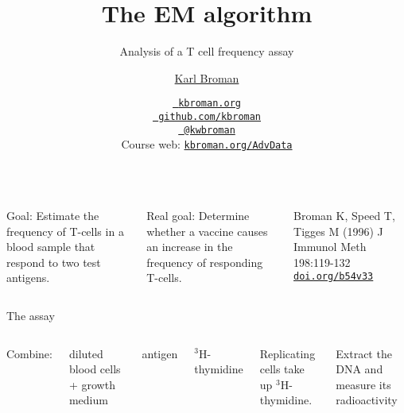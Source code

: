 \documentclass[aspectratio=169,12pt,t]{beamer}
\title{The EM algorithm}
\subtitle{Analysis of a T cell frequency assay}
\author{\href{https://kbroman.org}{Karl Broman}}
\institute{Biostatistics \& Medical Informatics, UW{\textendash}Madison}
\date{\href{https://kbroman.org}{\tt \scriptsize \color{foreground} kbroman.org}
\\[-4pt]
\href{https://github.com/kbroman}{\tt \scriptsize \color{foreground} github.com/kbroman}
\\[-4pt]
\href{https://twitter.com/kwbroman}{\tt \scriptsize \color{foreground} @kwbroman}
\\[-4pt]
{\scriptsize Course web: \href{https://kbroman.org/AdvData}{\tt kbroman.org/AdvData}}
}
\begin{document}
{
\frame{
  \titlepage

  \note{}

} }


\begin{frame}[c]{}

  \begin{columns}[c]
    \fontsize{10pt}{11}\selectfont
      \bbi
      \item[\hilit Goal:] Estimate the frequency of T-cells in a blood
        sample that respond to two test antigens.

      \item[\hilit Real goal:] Determine whether a vaccine causes an
        increase in the frequency of responding T-cells.
      \ei

      \vspace{10mm}

      \hspace*{-0.2\textwidth} {\fontsize{6pt}{6}\selectfont Broman K, Speed T, Tigges M (1996)
        J Immunol Meth 198:119-132
        \href{https://doi.org/b54v33}{\tt doi.org/b54v33}}



  \end{columns}


\end{frame}



\begin{frame}[c]{The assay}

  \begin{columns}[c]
    \fontsize{10pt}{11}\selectfont

    \bbi
  \item Combine:
    \bi
  \item diluted blood cells + growth medium
  \item antigen
  \item $^{\text{3}}$H-thymidine
    \ei

    \item Replicating cells take up $^{\text{3}}$H-thymidine.

    \item Extract the DNA and measure its radioactivity
      \ei


  \end{columns}

\end{frame}
\end{document}
